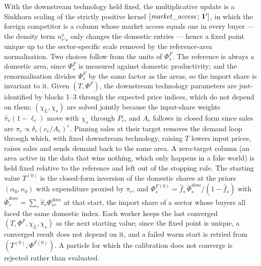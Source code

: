 With the downstream technology held fixed, the multiplicative update is a Sinkhorn scaling of the strictly positive kernel $[\mathit{market\_access}\,;\,\mathbf 1']$, in which the foreign competitor is a column whose market access equals one in every buyer --- the density term $n_{r's}^{\kappa}$ only changes the domestic entries --- hence a fixed point unique up to the sector-specific scale removed by the reference-area normalisation. Two choices follow from the units of $\Phi^F_s$. The reference is always a domestic area, since $\Phi^F_s$ is measured against domestic productivity; and the renormalisation divides $\Phi^F_s$ by the same factor as the areas, so the import share is invariant to it. Given $(T,\Phi^F)$, the downstream technology parameters are just-identified by blocks 1--3 through the expected price indices, which do not depend on them; $(\chi_L,\chi_s)$ are solved jointly because the input-share weights $\hat\pi_r(1-\ell_r)$ move with $\chi_s$ through $P_r$, and $A_r$ follows in closed form since sales are $\pi_r\propto\delta_r(c_r/A_r)^{\varepsilon}$. Pinning sales at their target removes the demand loop through which, with fixed downstream technology, raising $T$ lowers input prices, raises sales and sends demand back to the same area. A zero-target column (an area active in the data that wins nothing, which only happens in a fake world) is held fixed relative to the reference and left out of the stopping rule. The starting value $T^{(0)}$ is the closed-form inversion of the domestic shares at the priors $(\alpha_0,\kappa_0)$ with expenditure proxied by $\hat\pi_r$, and $\Phi^{F(0)}_s=\hat f_s\,\bar\Phi^{dom}_s/(1-\hat f_s)$ with $\bar\Phi^{dom}_s=\sum_r\hat\pi_r\Phi^{dom}_{sr}$ at that start, the import share of a sector whose buyers all faced the same domestic index. Each worker keeps the last converged $(T,\Phi^F,\chi_L,\chi_s)$ as the next starting value; since the fixed point is unique, a converged result does not depend on it, and a failed warm start is retried from $(T^{(0)},\Phi^{F(0)})$. A particle for which the calibration does not converge is rejected rather than evaluated. 

